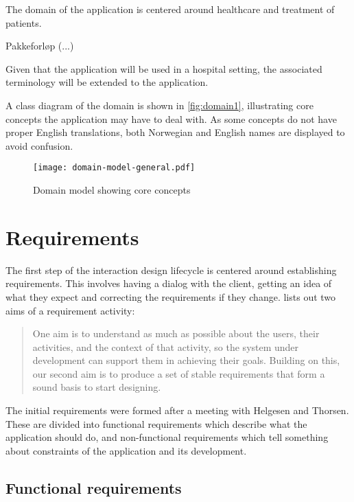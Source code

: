 The domain of the application is centered around healthcare and treatment of patients.

Pakkeforløp (...)

Given that the application will be used in a hospital setting, the associated terminology will be extended to the application.

A class diagram of the domain is shown in \autoref{fig:domain1}, illustrating core concepts the application may have to deal with. As some concepts do not have proper English translations, both Norwegian and English names are displayed to avoid confusion.


\begin{figure}
    \centering
    \texttt{[image: domain-model-general.pdf]}
    \caption{Domain model showing core concepts}
    \label{fig:domain1}
\end{figure}

\section{Requirements}
\label{sec:requirements}

The first step of the interaction design lifecycle is centered around establishing requirements. This involves having a dialog with the client, getting an idea of what they expect and correcting the requirements if they change. \textcite{preece2015} lists out two aims of a requirement activity:

\begin{quote}
    One aim is to understand as much as possible about the users, their activities, and the context of that activity, so the system under development can support them in achieving their goals. Building on this, our second aim is to produce a set of stable requirements that form a sound basis to start designing.
\end{quote}

The initial requirements were formed after a meeting with Helgesen and Thorsen. These are divided into functional requirements which describe what the application should do, and non-functional requirements which tell something about constraints of the application and its development.

\subsection{Functional requirements}

